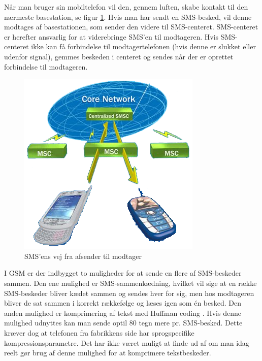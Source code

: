 Når man bruger sin mobiltelefon vil den, gennem luften, skabe kontakt til den nærmeste basestation, se figur \ref{GSM}. Hvis man har sendt en SMS-besked, vil denne modtages af basestationen, som sender den videre til SMS-centeret. SMS-centeret er herefter ansvarlig for at viderebringe SMS’en til modtageren. Hvis SMS-centeret ikke kan få forbindelse til modtagertelefonen (hvis denne er slukket eller udenfor signal), gemmes beskeden i centeret og sendes når der er oprettet forbindelse til modtageren. \cite{info}

\begin{figure}[H]
\centering
\includegraphics []{Billeder/GSMnetvaerk.png}
\caption {SMS'ens vej fra afsender til modtager \cite{info}}
\label {GSM}
\end{figure} 

I GSM er der indbygget to muligheder for at sende en flere af SMS-beskeder sammen. Den ene mulighed er SMS-sammenkædning, hvilket vil sige at en række SMS-beskeder bliver kædet sammen og sendes hver for sig, men hos modtageren bliver de sat sammen i korrekt rækkefølge og læses igen som én besked. Den anden mulighed er komprimering af tekst med Huffman coding \cite{UNI}. Hvis denne mulighed udnyttes kan man sende optil 80 tegn mere pr. SMS-besked. Dette kræver dog at telefonen fra fabrikkens side har sprogspecifike kompressionsparametre. Det har ikke været muligt at finde ud af om man idag reelt gør brug af denne mulighed for at komprimere tekstbeskeder. 
